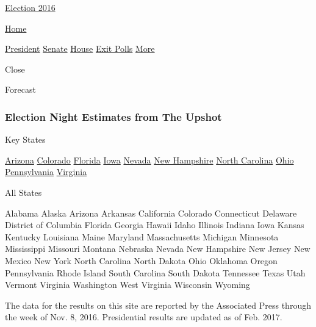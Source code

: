 \href{//www.nytimes.com}{} \href{//elections.nytimes.com}{ Election
2016}

\href{//www.nytimes.com}{ Home}

\href{//www.nytimes.com/elections/2016/results/president}{President}
\href{//www.nytimes.com/elections/2016/results/senate}{Senate}
\href{//www.nytimes.com/elections/2016/results/house}{House}
\href{//www.nytimes.com/interactive/2016/11/08/us/politics/election-exit-polls.html}{Exit
Polls} \href{//www.nytimes.com/elections\#}{More}

Close

Forecast

\href{//www.nytimes.com/elections/2016/forecast/president}{}

\hypertarget{election-night-estimates-from-the-upshot}{%
\subsubsection{Election Night Estimates from The
Upshot}\label{election-night-estimates-from-the-upshot}}

Key States

\href{//www.nytimes.com/elections/2016/results/arizona}{Arizona}
\href{//www.nytimes.com/elections/2016/results/colorado}{Colorado}
\href{//www.nytimes.com/elections/2016/results/florida}{Florida}
\href{//www.nytimes.com/elections/2016/results/iowa}{Iowa}
\href{//www.nytimes.com/elections/2016/results/nevada}{Nevada}
\href{//www.nytimes.com/elections/2016/results/new-hampshire}{New
Hampshire}
\href{//www.nytimes.com/elections/2016/results/north-carolina}{North
Carolina} \href{//www.nytimes.com/elections/2016/results/ohio}{Ohio}
\href{//www.nytimes.com/elections/2016/results/pennsylvania}{Pennsylvania}
\href{//www.nytimes.com/elections/2016/results/virginia}{Virginia}

All States

Alabama Alaska Arizona Arkansas California Colorado Connecticut Delaware
District of Columbia Florida Georgia Hawaii Idaho Illinois Indiana Iowa
Kansas Kentucky Louisiana Maine Maryland Massachusetts Michigan
Minnesota Mississippi Missouri Montana Nebraska Nevada New Hampshire New
Jersey New Mexico New York North Carolina North Dakota Ohio Oklahoma
Oregon Pennsylvania Rhode Island South Carolina South Dakota Tennessee
Texas Utah Vermont Virginia Washington West Virginia Wisconsin Wyoming

The data for the results on this site are reported by the Associated
Press through the week of Nov. 8, 2016. Presidential results are updated
as of Feb. 2017.

